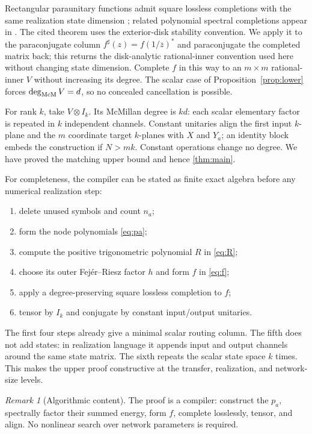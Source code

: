 \documentclass[11pt]{article}
\theoremstyle{definition}\newtheorem{definition}[theorem]{Definition}\newtheorem{example}[theorem]{Example}
\theoremstyle{remark}\newtheorem{remark}[theorem]{Remark}\newtheorem{limitation}[theorem]{Limitation}
\begin{document}
Rectangular paraunitary functions admit square lossless completions with the
same realization state dimension \cite[Theorem 2.1(ii)]{AlpayJorgensenLewkowicz2016};
related polynomial spectral completions appear in
\cite{EphremidzeLagvilava2011}.  The cited theorem uses the exterior-disk
stability convention.  We apply it to the paraconjugate column
$f^\sharp(z)=f(1/\overline z)^*$ and paraconjugate the completed matrix back;
this returns the disk-analytic rational-inner convention used here without
changing state dimension.  Complete $f$ in this way to an $m\times m$
rational-inner $V$ without increasing its degree.  The scalar case of
Proposition~\ref{prop:lower} forces $\deg_{\mathrm{McM}} V=d$, so no concealed cancellation is
possible.

For rank $k$, take $V\otimes I_k$.  Its McMillan degree is $kd$: each scalar
elementary factor is repeated in $k$ independent channels.  Constant
unitaries align the first input $k$-plane and the $m$ coordinate target
$k$-planes with $X$ and $Y_a$; an identity block embeds the construction if
$N>mk$.  Constant operations change no degree.  We have proved the matching
upper bound and hence \cref{thm:main}.

For completeness, the compiler can be stated as finite exact algebra before
any numerical realization step:
\begin{enumerate}
\item delete unused symbols and count $n_a$;
\item form the node polynomials \eqref{eq:pa};
\item compute the positive trigonometric polynomial $R$ in \eqref{eq:R};
\item choose its outer Fej\'er--Riesz factor $h$ and form $f$ in
      \eqref{eq:f};
\item apply a degree-preserving square lossless completion to $f$;
\item tensor by $I_k$ and conjugate by constant input/output unitaries.
\end{enumerate}
The first four steps already give a minimal scalar routing column.  The fifth
does not add states: in realization language it appends input and output
channels around the same state matrix.  The sixth repeats the scalar state
space $k$ times.  This makes the upper proof constructive at the transfer,
realization, and network-size levels.

\begin{remark}[Algorithmic content]
The proof is a compiler: construct the $p_a$, spectrally factor their summed
energy, form $f$, complete losslessly, tensor, and align.  No nonlinear
search over network parameters is required.
\end{remark}
\end{document}
